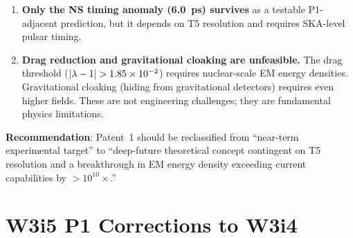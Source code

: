 \begin{tcolorbox}[colback=red!3!white, colframe=red!60!black,
  title=\textbf{W3i5 P1: Complete Honest Assessment}]
\begin{enumerate}[label=\textbf{\arabic*.}, itemsep=6pt]
\item \textbf{Only the NS timing anomaly (6.0~ps) survives} as a testable
P1-adjacent prediction, but it depends on T5 resolution and requires
SKA-level pulsar timing.

\item \textbf{Drag reduction and gravitational cloaking are unfeasible.}
The drag threshold ($|\lambda - 1| > 1.85\times 10^{-2}$) requires nuclear-scale EM
energy densities. Gravitational cloaking (hiding from gravitational
detectors) requires even higher fields. These are not engineering
challenges; they are fundamental physics limitations.
\end{enumerate}

\textbf{Recommendation}: Patent~1 should be reclassified from
``near-term experimental target'' to ``deep-future theoretical concept
contingent on T5 resolution and a breakthrough in EM energy density
exceeding current capabilities by $>10^{10}\times$.''
\end{tcolorbox}

\section{W3i5 P1 Corrections to W3i4}
\label{sec:corrections}

